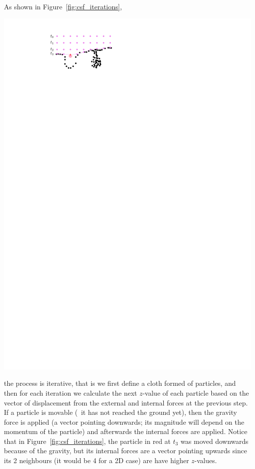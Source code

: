 As shown in Figure~\ref{fig:csf_iterations},
\begin{marginfigure}
  \centering
  \includegraphics[width=\linewidth]{figs/csf_iterations}
  \caption{}%
\label{fig:csf_iterations}
\end{marginfigure}
the process is iterative, that is we first define a cloth formed of particles, and then for each iteration we calculate the next $z$-value of each particle based on the vector of displacement from the external and internal forces at the previous step.
If a particle is movable (\ie\ it has not reached the ground yet), then the gravity force is applied (a vector pointing downwards; its magnitude will depend on the momentum of the particle) and afterwards the internal forces are applied.
Notice that in Figure~\ref{fig:csf_iterations}, the particle in red at $t_3$ was moved downwards because of the gravity, but its internal forces are a vector pointing upwards since its 2 neighbours (it would be 4 for a 2D case) are have higher $z$-values.


